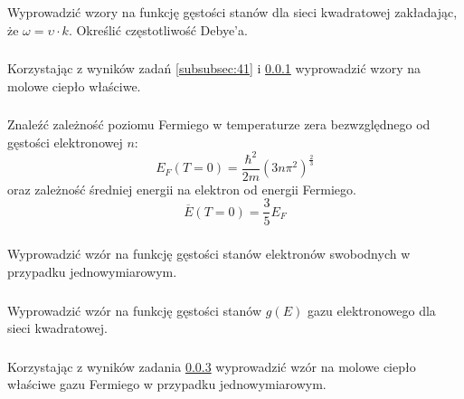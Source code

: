 \subsubsection{}
\label{subsubsec:42}
Wyprowadzić wzory na funkcję gęstości stanów dla sieci kwadratowej zakładając, że $\omega = \upsilon \cdot k$. Określić częstotliwość Debye'a.


\subsubsection{}
Korzystając z wyników zadań \ref{subsubsec:41} i \ref{subsubsec:42} wyprowadzić wzory na molowe ciepło właściwe.


\subsubsection{}
\label{subsubsec:44}
Znaleźć zależność poziomu Fermiego w temperaturze zera bezwzględnego od gęstości elektronowej $n$:
\[E_F(T=0) = \frac{\hbar^2}{2m}(3n\pi^2)^{\frac{2}{3}}\]
oraz zależność średniej energii na elektron od energii Fermiego.
\[ \overline{E}(T=0) = \frac{3}{5}E_F \]


\subsubsection{}
Wyprowadzić wzór na funkcję gęstości stanów elektronów swobodnych w przypadku jednowymiarowym.


\subsubsection{}
Wyprowadzić wzór na funkcję gęstości stanów $g(E)$  gazu elektronowego dla sieci kwadratowej.


\subsubsection{}
Korzystając z wyników zadania \ref{subsubsec:44} wyprowadzić wzór na molowe ciepło właściwe gazu Fermiego w przypadku jednowymiarowym.
